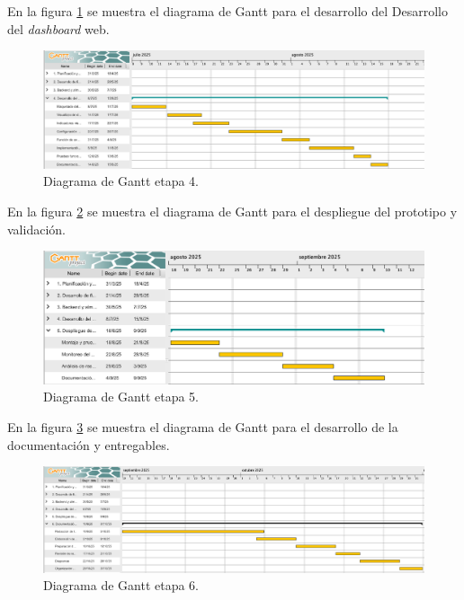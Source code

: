 \documentclass[
11pt, %
]{charter}
\begin{document}
En la figura \ref{fig:AoN5} se muestra el diagrama de Gantt para el desarrollo del Desarrollo del \textit{dashboard} web.
\begin{figure}[htpb]
    \centering 
    \includegraphics[width=1.05\textwidth]{./Figuras/gantt5.png}
    \caption{Diagrama de Gantt etapa 4.}
    \label{fig:AoN5}
    \end{figure}

    \newpage

En la figura \ref{fig:AoN6} se muestra el diagrama de Gantt para el despliegue del prototipo y validación.
\begin{figure}[htpb]
    \centering 
    \includegraphics[width=1.05\textwidth]{./Figuras/gantt6.png}
    \caption{Diagrama de Gantt etapa 5.}
    \label{fig:AoN6}
    \end{figure}

En la figura \ref{fig:AoN7} se muestra el diagrama de Gantt para el desarrollo de la documentación y entregables.
\begin{figure}[htpb]
    \centering 
    \includegraphics[width=1.05\textwidth]{./Figuras/gantt7.png}
    \caption{Diagrama de Gantt etapa 6.}
    \label{fig:AoN7}
    \end{figure}
\end{document}
